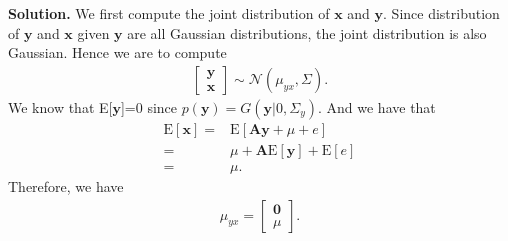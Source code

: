 \documentclass[12pt,a4paper,UTF8,fntef]{article}
\begin{document}
\textbf{Solution.} \quad We first compute the joint distribution of $\mathbf{x}$ and $\mathbf{y}$. Since distribution of $\mathbf{y}$ and $\mathbf{x}$ given $\mathbf{y}$ are all Gaussian distributions, the joint distribution is also Gaussian. Hence we are to compute
\begin{align*}
	\begin{bmatrix}
		\mathbf{y} \\ \mathbf{x}
	\end{bmatrix} \sim \mathcal{N}(\mu_{yx},\Sigma).
\end{align*}
We know that E[$\mathbf{y}$]=0 since  $p(\mathbf{y})=G(\mathbf{y}|0,\Sigma_y)$. And we have that
\begin{align*}
	\text{E}[\mathbf{x}]=&\text{E}[\mathbf{Ay}+\mu+e]\\
						=&\mu+\mathbf{A}\text{E}[\mathbf{y}]+\text{E}[e]\\
						=&\mu.
\end{align*}
Therefore, we have
\begin{align*}
	\mu_{yx}=\begin{bmatrix}
		\mathbf{0} \\ \mu
	\end{bmatrix}. 
\end{align*}
\end{document}
